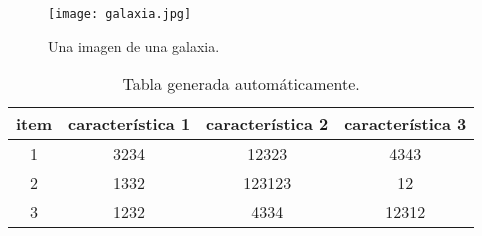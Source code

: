 \begin{figure}[t]
    \centering
    \texttt{[image: galaxia.jpg]}
    \caption{Una imagen de una galaxia.}
    \label{fig:mesh1}
\end{figure}

\begin{table}[b]
\centering
\begin{tabular}{|c|c|c|c|}
\hline
\textbf{item} & \textbf{característica 1} & \textbf{característica 2} & \textbf{característica 3} \\ \hline
1             & 3234                      & 12323                     & 4343                      \\ \hline
2             & 1332                      & 123123                    & 12                        \\ \hline
3             & 1232                      & 4334                      & 12312                     \\ \hline
\end{tabular}
\caption{Tabla generada automáticamente.}
    \label{cuadro:prueba2}
\end{table}

